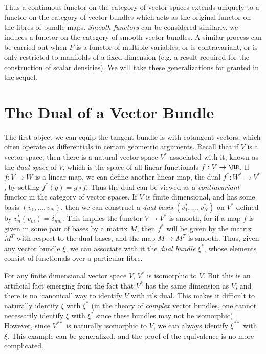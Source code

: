 Thus a continuous functor on the category of vector spaces extends uniquely to a functor on the category of vector bundles which acts as the original functor on the fibres of bundle maps. \emph{Smooth functors} can be considered similarly, we induces a functor on the category of smooth vector bundles. A similar process can be carried out when $F$ is a functor of multiple variables, or is contravariant, or is only restricted to manifolds of a fixed dimension (e.g. a result required for the construction of scalar densities). We will take these generalizations for granted in the sequel.

\section{The Dual of a Vector Bundle}

The first object we can equip the tangent bundle is with cotangent vectors, which often operate as differentials in certain geometric arguments. Recall that if $V$ is a vector space, then there is a natural vector space $V^*$ associated with it, known as the {\it dual space} of $V$, which is the space of all linear functionals $f: V \to \RR$. If $f: V \to W$ is a linear map, we can define another linear map, the dual $f^*: W^* \to V^*$, by setting $f^*(g) = g \circ f$. Thus the dual can be viewed as a {\it contravariant} functor in the category of vector spaces. If $V$ is finite dimensional, and has some basis $(v_1, \dots, v_N)$, then we can construct a {\it dual basis} $(v_1^*, \dots, v_N^*)$ on $V^*$ defined by $v_n^*(v_m) = \delta_{nm}$. This implies the functor $V \mapsto V^*$ is smooth, for if a map $f$ is given in some pair of bases by a matrix $M$, then $f^*$ will be given by the matrix $M^T$ with respect to the dual bases, and the map $M \mapsto M^T$ is smooth. Thus, given any vector bundle $\xi$, we can associate with it the {\it dual bundle} $\xi^*$, whose elements consist of functionals over a particular fibre.

For any finite dimensional vector space $V$, $V^*$ is isomorphic to $V$. But this is an artificial fact emerging from the fact that $V^*$ has the same dimension as $V$, and there is no `canonical' way to identify $V$ with it's dual. This makes it difficult to naturally identify $\xi$ with $\xi^*$ (in the theory of \emph{complex} vector bundles, one cannot necessarily identify $\xi$ with $\xi^*$ since these bundles may not be isomorphic). However, since $V^{**}$ is naturally isomorphic to $V$, we can always identify $\xi^{**}$ with $\xi$. This example can be generalized, and the proof of the equivalence is no more complicated.

